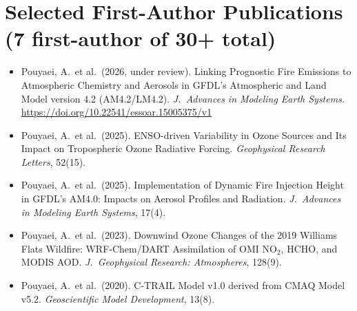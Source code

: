 \documentclass[10pt]{article}
\begin{document}
\section*{Selected First-Author Publications (7 first-author of 30+ total)}
\begin{itemize}
  \item Pouyaei, A.\ et al.\ (2026, under review). Linking Prognostic Fire
    Emissions to Atmospheric Chemistry and Aerosols in GFDL's Atmospheric and
    Land Model version 4.2 (AM4.2/LM4.2). \textit{J.\ Advances in Modeling
    Earth Systems.} \url{https://doi.org/10.22541/essoar.15005375/v1}
  \item Pouyaei, A.\ et al.\ (2025). ENSO-driven Variability in Ozone Sources
    and Its Impact on Tropospheric Ozone Radiative Forcing.
    \textit{Geophysical Research Letters}, 52(15).
  \item Pouyaei, A.\ et al.\ (2025). Implementation of Dynamic Fire Injection
    Height in GFDL's AM4.0: Impacts on Aerosol Profiles and Radiation.
    \textit{J.\ Advances in Modeling Earth Systems}, 17(4).
  \item Pouyaei, A.\ et al.\ (2023). Downwind Ozone Changes of the 2019
    Williams Flats Wildfire: WRF-Chem/DART Assimilation of OMI NO$_2$, HCHO,
    and MODIS AOD. \textit{J.\ Geophysical Research: Atmospheres}, 128(9).
  \item Pouyaei, A.\ et al.\ (2020). C-TRAIL Model v1.0 derived from CMAQ
    Model v5.2. \textit{Geoscientific Model Development}, 13(8).
\end{itemize}
\end{document}
